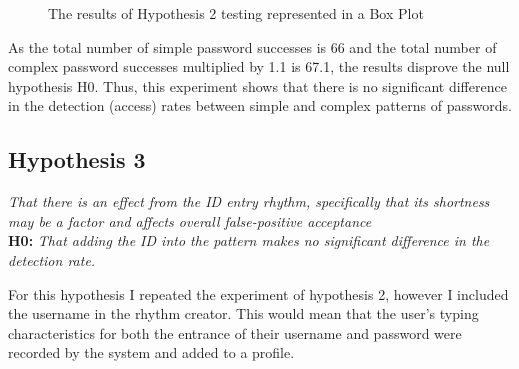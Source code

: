 \documentclass{article}
\begin{document}
\begin{figure} [H]
    \centering
    \caption{The results of Hypothesis 2 testing represented in a Box Plot}
    \label{fig:boxPlotHyp2}
\end{figure}

As the total number of simple password successes is 66 and the total number of complex password successes multiplied by 1.1 is 67.1, the results disprove the null hypothesis H0. Thus, this experiment shows that there is no significant difference in the detection (access) rates between simple and complex patterns of passwords. 

\subsection{Hypothesis 3}
\begin{center}
\textit{That there is an effect from the ID entry rhythm, specifically that its shortness may be a factor and affects overall false-positive acceptance} \newline \\

\textbf{H0:} \textit{That adding the ID	into the	pattern makes no significant	difference in the detection	rate.} \newline \\
\end{center}

For this hypothesis I repeated the experiment of hypothesis 2, however I included the username in the rhythm creator. This would mean that the user's typing characteristics for both the entrance of their username and password were recorded by the system and added to a profile.  
\end{document}
